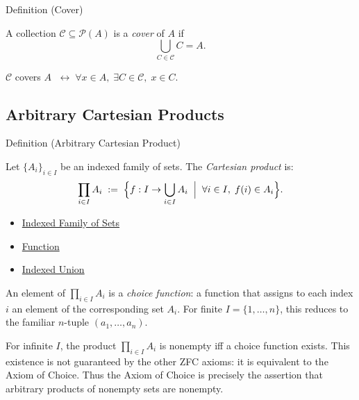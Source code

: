 \begin{definitionbox}{Definition (Cover)}
\begin{definition}[Cover]\label{def:set-cover}
A collection $\mathcal{C} \subseteq \mathcal{P}(A)$ is a \emph{cover} of $A$ if
\[
\bigcup_{C \in \mathcal{C}} C = A.
\]
\end{definition}
\end{definitionbox}

\NoLocalDependencies

\begin{remark*}
$\mathcal{C}$ covers $A$ $\;\leftrightarrow\; \forall x \in A,\; \exists C \in \mathcal{C},\; x \in C$.
\end{remark*}

\begin{exposition}
\vspace{1em}
\end{exposition}
\subsection*{Arbitrary Cartesian Products}

\begin{definitionbox}{Definition (Arbitrary Cartesian Product)}
\begin{definition}\label{def:arbitrary-product}
Let $\{A_i\}_{i \in I}$ be an indexed family of sets. The \emph{Cartesian
product} is:
\[
\prod_{i \in I} A_i
\;:=\;
\Bigl\{
f : I \to \bigcup_{i \in I} A_i
\;\Bigm|\;
\forall i \in I,\; f(i) \in A_i
\Bigr\}.
\]
\end{definition}
\end{definitionbox}

\begin{dependencies}
\begin{itemize}
  \item \hyperref[def:indexed-family]{Indexed Family of Sets}
  \item \hyperref[def:function]{Function}
  \item \hyperref[def:indexed-union]{Indexed Union}
\end{itemize}
\end{dependencies}

\begin{remark*}
An element of $\prod_{i \in I} A_i$ is a \emph{choice function}: a function
that assigns to each index $i$ an element of the corresponding set $A_i$.
For finite $I = \{1,\dots,n\}$, this reduces to the familiar $n$-tuple
$(a_1,\dots,a_n)$.
\end{remark*}

\begin{remark*}
For infinite $I$, the product $\prod_{i \in I} A_i$ is nonempty iff a choice
function exists. This existence is not guaranteed by the other ZFC axioms:
it is equivalent to the Axiom of Choice. Thus the Axiom of Choice is
precisely the assertion that arbitrary products of nonempty sets are nonempty.
\end{remark*}
